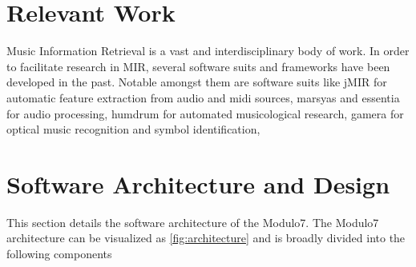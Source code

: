 \documentclass{article}
\begin{document}
%
\section{Relevant Work} \label{sec:relevantwork}

Music Information Retrieval is a vast and interdisciplinary body of work. In order to facilitate research in MIR, several software suits and frameworks have been developed in the past. Notable amongst them are software suits like jMIR \cite{jMIR} for automatic feature extraction from audio and midi sources, marsyas \cite{marsyas} and essentia \cite{essentia} for audio processing, humdrum \cite{humdrum} for automated musicological research, gamera \cite{gamera} for optical music recognition and symbol identification, 

\section{Software Architecture and Design}\label{sec:architecture}

This section details the software architecture of the Modulo7. The Modulo7 architecture can be visualized as \ref{fig:architecture} and is broadly divided into the following components 
\end{document}
